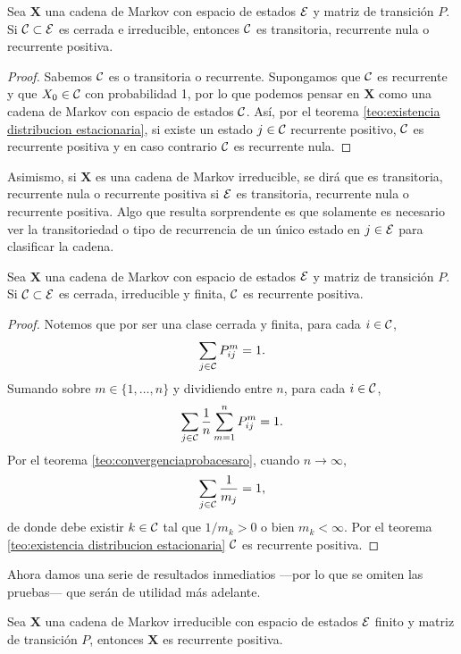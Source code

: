 \begin{corollary}
    Sea $\bm X$ una cadena de Markov con espacio de estados $\mathcal{E}$ y matriz de transición $P$. Si $\mathcal{C} \subset \mathcal{E}$ es cerrada e irreducible, entonces $\mathcal{C}$ es transitoria, recurrente nula o recurrente positiva.
\end{corollary}

\begin{proof}
    Sabemos $\mathcal{C}$ es o transitoria o recurrente. Supongamos que $\mathcal{C}$ es recurrente y que $X_0 \in \mathcal{C}$ con probabilidad 1, por lo que podemos pensar en $\bm X$ como una cadena de Markov con espacio de estados $\mathcal{C}$. Así, por el teorema \ref{teo:existencia distribucion estacionaria}, si existe un estado $j \in \mathcal{C}$ recurrente positivo, $\mathcal{C}$ es recurrente positiva y en caso contrario $\mathcal{C}$ es recurrente nula.
\end{proof}

Asimismo, si $\bm X$ es una cadena de Markov irreducible, se dirá que es transitoria, recurrente nula o recurrente positiva si $\mathcal{E}$ es transitoria, recurrente nula o recurrente positiva. Algo que resulta sorprendente es que solamente es necesario ver la transitoriedad o tipo de recurrencia de un único estado en $j \in \mathcal{E}$ para clasificar la cadena.

\begin{corollary}
        Sea $\bm X$ una cadena de Markov con espacio de estados $\mathcal{E}$ y matriz de transición $P$. Si $\mathcal{C} \subset \mathcal{E}$ es cerrada, irreducible y finita, $\mathcal{C}$ es recurrente positiva.
\end{corollary}

\begin{proof}
    Notemos que por ser una clase cerrada y finita, para cada $i \in \mathcal{C}$,
    \[
        \sum_{j \in \mathcal{C}} P_{ij}^m = 1.
    \]
    Sumando sobre $m \in \{1, \ldots, n\}$ y dividiendo entre $n$, para cada $i \in \mathcal{C}$,
    \[
        \sum_{j \in \mathcal{C}} \frac 1 n \sum_{m = 1}^n P_{ij}^m = 1.    
    \]
    Por el teorema \ref{teo:convergenciaprobacesaro}, cuando $n \to \infty$,
    \[
        \sum_{j \in \mathcal{C}} \frac 1 {m_j} = 1, 
    \]
    de donde debe existir $k \in \mathcal{C}$ tal que $1/m_k > 0$ o bien $m_k < \infty$. Por el teorema \ref{teo:existencia distribucion estacionaria} $\mathcal{C}$ es recurrente positiva.
\end{proof}

Ahora damos una serie de resultados inmediatios ---por lo que se omiten las pruebas--- que serán de utilidad más adelante.

\begin{corollary}
    Sea $\bm X$ una cadena de Markov irreducible con espacio de estados $\mathcal{E}$ finito y matriz de transición $P$, entonces $\bm X$ es recurrente positiva.
\end{corollary}

